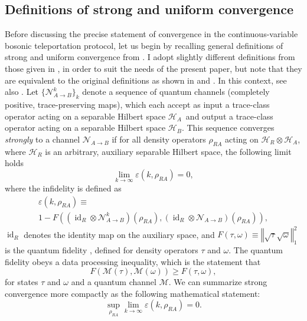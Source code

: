\documentclass[apsrev,twocolumn]{revtex4-1}%
\begin{document}
\subsection{Definitions of strong and uniform convergence}

Before discussing the precise statement of convergence in the
continuous-variable bosonic teleportation protocol, let us begin by recalling
general definitions of strong and uniform convergence from \cite[Section~3]%
{SH08}. I adopt slightly different definitions from those given in
\cite[Section~3]{SH08}, in order to suit the needs of the present paper, but
note that they are equivalent to the original definitions as shown in
\cite{SH08} and \cite[Lemma~2]{Sh17}. In this context, see also \cite{Sh17a}.
Let $\{\mathcal{N}_{A\rightarrow B}^{k}\}_{k}$ denote a sequence of quantum
channels (completely positive, trace-preserving maps), which each accept as
input a trace-class operator acting on a separable Hilbert space
$\mathcal{H}_{A}$\ and output a trace-class operator acting on a separable
Hilbert space $\mathcal{H}_{B}$. This sequence converges \textit{strongly} to
a channel $\mathcal{N}_{A\rightarrow B}$ if for all density operators
$\rho_{RA}$ acting on $\mathcal{H}_{R}\otimes\mathcal{H}_{A}$, where
$\mathcal{H}_{R}$ is an arbitrary, auxiliary separable Hilbert space, the
following limit holds%
\begin{equation}
\lim_{k\rightarrow\infty}\varepsilon(k,\rho_{RA})=0,
\end{equation}
where the infidelity is defined as%
\begin{multline}
\varepsilon(k,\rho_{RA})\equiv\\
1-F((\operatorname{id}_{R}\otimes\mathcal{N}_{A\rightarrow B}^{k})(\rho
_{RA}),(\operatorname{id}_{R}\otimes\mathcal{N}_{A\rightarrow B})(\rho_{RA})),
\end{multline}
$\operatorname{id}_{R}$ denotes the identity map on the auxiliary space, and
$F(\tau,\omega)\equiv\left\Vert \sqrt{\tau}\sqrt{\omega}\right\Vert _{1}^{2}$
is the quantum fidelity \cite{U76}, defined for density operators $\tau$ and
$\omega$. The quantum fidelity obeys a data processing inequality, which is
the statement that%
\begin{equation}
F(\mathcal{M}(\tau),\mathcal{M}(\omega))\geq F(\tau,\omega),
\end{equation}
for states $\tau$ and $\omega$ and a quantum channel $\mathcal{M}$. We can
summarize strong convergence more compactly as the following mathematical
statement:%
\begin{equation}
\sup_{\rho_{RA}}\lim_{k\rightarrow\infty}\varepsilon(k,\rho_{RA})=0.
\label{eq:strong-conv-def-compact}%
\end{equation}
\end{document}
